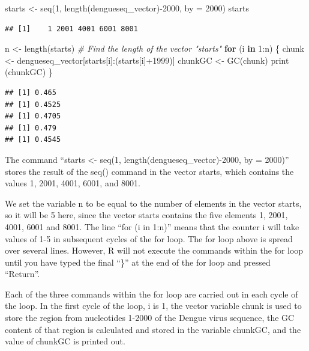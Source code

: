\documentclass[
]{book}
\newenvironment{Shaded}{\begin{snugshade}}{\end{snugshade}}
\newcommand{\AttributeTok}[1]{\textcolor[rgb]{0.77,0.63,0.00}{#1}}
\newcommand{\CommentTok}[1]{\textcolor[rgb]{0.56,0.35,0.01}{\textit{#1}}}
\newcommand{\ControlFlowTok}[1]{\textcolor[rgb]{0.13,0.29,0.53}{\textbf{#1}}}
\newcommand{\DecValTok}[1]{\textcolor[rgb]{0.00,0.00,0.81}{#1}}
\newcommand{\FunctionTok}[1]{\textcolor[rgb]{0.00,0.00,0.00}{#1}}
\newcommand{\NormalTok}[1]{#1}
\newcommand{\OtherTok}[1]{\textcolor[rgb]{0.56,0.35,0.01}{#1}}
\newcommand{\SpecialCharTok}[1]{\textcolor[rgb]{0.00,0.00,0.00}{#1}}
\begin{document}
\begin{Shaded}
\begin{Highlighting}[]
\NormalTok{starts }\OtherTok{\textless{}{-}} \FunctionTok{seq}\NormalTok{(}\DecValTok{1}\NormalTok{, }\FunctionTok{length}\NormalTok{(dengueseq\_vector)}\SpecialCharTok{{-}}\DecValTok{2000}\NormalTok{, }\AttributeTok{by =} \DecValTok{2000}\NormalTok{)}
\NormalTok{starts}
\end{Highlighting}
\end{Shaded}

\begin{verbatim}
## [1]    1 2001 4001 6001 8001
\end{verbatim}

\begin{Shaded}
\begin{Highlighting}[]
\NormalTok{ n }\OtherTok{\textless{}{-}} \FunctionTok{length}\NormalTok{(starts)    }\CommentTok{\# Find the length of the vector "starts"}
 \ControlFlowTok{for}\NormalTok{ (i }\ControlFlowTok{in} \DecValTok{1}\SpecialCharTok{:}\NormalTok{n) \{}
\NormalTok{        chunk }\OtherTok{\textless{}{-}}\NormalTok{ dengueseq\_vector[starts[i]}\SpecialCharTok{:}\NormalTok{(starts[i]}\SpecialCharTok{+}\DecValTok{1999}\NormalTok{)]}
\NormalTok{        chunkGC }\OtherTok{\textless{}{-}} \FunctionTok{GC}\NormalTok{(chunk)}
        \FunctionTok{print}\NormalTok{ (chunkGC)}
\NormalTok{     \}}
\end{Highlighting}
\end{Shaded}

\begin{verbatim}
## [1] 0.465
## [1] 0.4525
## [1] 0.4705
## [1] 0.479
## [1] 0.4545
\end{verbatim}

The command ``starts \textless- seq(1, length(dengueseq\_vector)-2000, by = 2000)'' stores the result of the seq() command in the vector starts, which contains the values 1, 2001, 4001, 6001, and 8001.

We set the variable n to be equal to the number of elements in the vector starts, so it will be 5 here, since the vector starts contains the five elements 1, 2001, 4001, 6001 and 8001. The line ``for (i in 1:n)'' means that the counter i will take values of 1-5 in subsequent cycles of the for loop. The for loop above is spread over several lines. However, R will not execute the commands within the for loop until you have typed the final ``\}'' at the end of the for loop and pressed ``Return''.

Each of the three commands within the for loop are carried out in each cycle of the loop. In the first cycle of the loop, i is 1, the vector variable chunk is used to store the region from nucleotides 1-2000 of the Dengue virus sequence, the GC content of that region is calculated and stored in the variable chunkGC, and the value of chunkGC is printed out.
\end{document}
